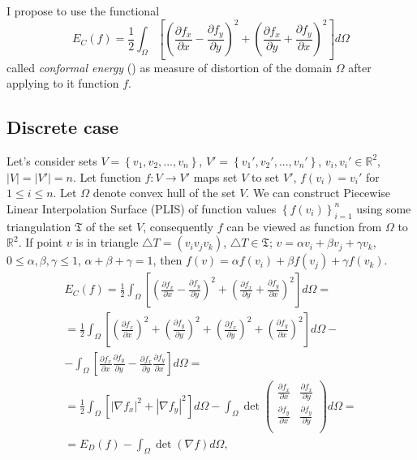 \documentclass{article}
\begin{document}
I propose to use the functional 
\begin{equation*}
  E_C(f) = \frac{1}{2} \int_{\Omega}\left[{\left(\frac{\partial f_x}{\partial x} - \frac{\partial f_y}{\partial y}\right)^2 + \left(\frac{\partial f_x}{\partial y} + \frac{\partial f_y}{\partial x}\right)^2}\right] d\Omega   
\end{equation*}
called \textit{conformal energy} (\cite{Polthier}) as measure of distortion of the domain $\Omega$ after applying to it function $f$.

\subsection{Discrete case}
\label{sec:discrete}
Let's consider sets $V = \left\{v_1, v_2, ... , v_n\right\}$, $V' = \left\{v_1', v_2', ... , v_n'\right\}$, $v_i, v_i' \in \mathbb{R}^2$, $|V| = |V'| = n$. Let function $f: V \to V'$ maps set $V$ to set $V'$, 
$f(v_i) = v_i'$ for $1 \le i \le n$. Let $\Omega$ denote convex hull of the set $V$. We can construct Piecewise Linear Interpolation Surface (PLIS) of function values $\left\{f(v_i)\right\}_{i=1}^n$ 
using some triangulation $\mathfrak{T}$ of the set $V$, consequently $f$ can be viewed as function from $\Omega$ to~$\mathbb{R}^2$. If point $v$ is in triangle $\triangle T = (v_i v_j v_k)$, $\triangle T \in \mathfrak{T}$; 
$v = \alpha v_i + \beta v_j + \gamma v_k$, $0 \le \alpha, \beta, \gamma \le 1$, $\alpha + \beta + \gamma = 1$, then $f(v) = \alpha f(v_i) + \beta f(v_j) + \gamma f(v_k)$.
\begin{multline}
\label{formula:EC}
  E_C(f) =
  \frac{1}{2} \int_{\Omega}\left[{\left(\frac{\partial f_x}{\partial x} - \frac{\partial f_y}{\partial y}\right)^2 + \left(\frac{\partial f_x}{\partial y} + \frac{\partial f_y}{\partial x}\right)^2}\right] d\Omega = \\
  = \frac{1}{2} \int_{\Omega}\left[\left(\frac{\partial f_x}{\partial x}\right)^2 + \left(\frac{\partial f_y}{\partial y}\right)^2 + \left(\frac{\partial f_x}{\partial y}\right)^2 + 
  \left(\frac{\partial f_y}{\partial x}\right)^2 \right] d\Omega - \\
  - \int_{\Omega}\left[\frac{\partial f_x}{\partial x} \frac{\partial f_y}{\partial y} - \frac{\partial f_x}{\partial y} \frac{\partial f_y}{\partial x}\right] d\Omega = \\
  = \frac{1}{2} \int_{\Omega} \left[ \left| \nabla f_x \right| ^ 2 + \left| \nabla f_y \right| ^ 2 \right] d\Omega - \int_{\Omega} \det {\begin{pmatrix} 
    \frac{\partial f_x}{\partial x} & \frac{\partial f_x}{\partial y} \\
    \frac{\partial f_y}{\partial x} & \frac{\partial f_y}{\partial y} \\
  \end{pmatrix}} d\Omega = \\
  = E_D(f) - \int_{\Omega} \det (\nabla f) d\Omega,
\end{multline}
\end{document}
